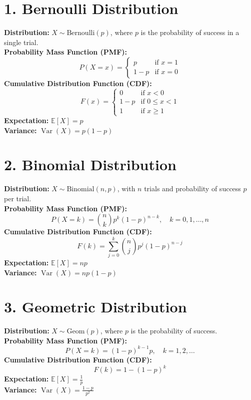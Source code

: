 \section*{1. Bernoulli Distribution}
\textbf{Distribution:} \( X \sim \text{Bernoulli}(p) \), where \( p \) is the probability of success in a single trial.\\
\textbf{Probability Mass Function (PMF):}
\[
P(X = x) = 
\begin{cases} 
p & \text{if } x = 1 \\ 
1 - p & \text{if } x = 0 
\end{cases}
\]
\textbf{Cumulative Distribution Function (CDF):}
\[
F(x) = 
\begin{cases} 
0 & \text{if } x < 0 \\ 
1 - p & \text{if } 0 \le x < 1 \\ 
1 & \text{if } x \ge 1 
\end{cases}
\]
\textbf{Expectation:} \( \mathbb{E}[X] = p \)\\
\textbf{Variance:} \( \operatorname{Var}(X) = p(1 - p) \)

\section*{2. Binomial Distribution}
\textbf{Distribution:} \( X \sim \text{Binomial}(n, p) \), with \( n \) trials and probability of success \( p \) per trial.\\
\textbf{Probability Mass Function (PMF):}
\[
P(X = k) = \binom{n}{k} p^k (1 - p)^{n - k}, \quad k = 0, 1, \ldots, n
\]
\textbf{Cumulative Distribution Function (CDF):}
\[
F(k) = \sum_{j=0}^{k} \binom{n}{j} p^j (1 - p)^{n - j}
\]
\textbf{Expectation:} \( \mathbb{E}[X] = np \)\\
\textbf{Variance:} \( \operatorname{Var}(X) = np(1 - p) \)

\section*{3. Geometric Distribution}
\textbf{Distribution:} \( X \sim \text{Geom}(p) \), where \( p \) is the probability of success.\\
\textbf{Probability Mass Function (PMF):}
\[
P(X = k) = (1 - p)^{k - 1} p, \quad k = 1, 2, \ldots
\]
\textbf{Cumulative Distribution Function (CDF):}
\[
F(k) = 1 - (1 - p)^k
\]
\textbf{Expectation:} \( \mathbb{E}[X] = \frac{1}{p} \)\\
\textbf{Variance:} \( \operatorname{Var}(X) = \frac{1 - p}{p^2} \)

